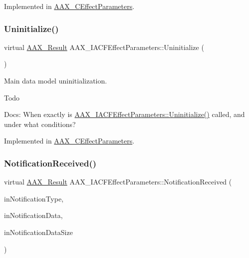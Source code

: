 Implemented in \mbox{\hyperlink{a01481_a245f235300b04f1c8b4c83831d296e22}{A\+A\+X\+\_\+\+C\+Effect\+Parameters}}.

\mbox{\label{a01669_a711969adc95624fb9ac8a3e3b2c23696}} 
\subsubsection{\texorpdfstring{Uninitialize()}{Uninitialize()}}
{\footnotesize\ttfamily virtual \mbox{\hyperlink{a00392_a4d8f69a697df7f70c3a8e9b8ee130d2f}{A\+A\+X\+\_\+\+Result}} A\+A\+X\+\_\+\+I\+A\+C\+F\+Effect\+Parameters\+::\+Uninitialize (\begin{DoxyParamCaption}{ }\end{DoxyParamCaption})\hspace{0.3cm}{\ttfamily [pure virtual]}}



Main data model uninitialization. 

\begin{DoxyRefDesc}{Todo}
\item[\mbox{\hyperlink{a00785__todo000035}{Todo}}]Docs\+: When exactly is \mbox{\hyperlink{a01669_a711969adc95624fb9ac8a3e3b2c23696}{A\+A\+X\+\_\+\+I\+A\+C\+F\+Effect\+Parameters\+::\+Uninitialize()}} called, and under what conditions?\end{DoxyRefDesc}


Implemented in \mbox{\hyperlink{a01481_acd14ff2175a10759045674e8e14508b1}{A\+A\+X\+\_\+\+C\+Effect\+Parameters}}.

\mbox{\label{a01669_aa3eaeb292d2ca84086a5a058171994fd}} 
\subsubsection{\texorpdfstring{NotificationReceived()}{NotificationReceived()}}
{\footnotesize\ttfamily virtual \mbox{\hyperlink{a00392_a4d8f69a697df7f70c3a8e9b8ee130d2f}{A\+A\+X\+\_\+\+Result}} A\+A\+X\+\_\+\+I\+A\+C\+F\+Effect\+Parameters\+::\+Notification\+Received (\begin{DoxyParamCaption}\item[{\mbox{\hyperlink{a00392_ac678f9c1fbcc26315d209f71a147a175}{A\+A\+X\+\_\+\+C\+Type\+ID}}}]{in\+Notification\+Type,  }\item[{const void $\ast$}]{in\+Notification\+Data,  }\item[{uint32\+\_\+t}]{in\+Notification\+Data\+Size }\end{DoxyParamCaption})\hspace{0.3cm}{\ttfamily [pure virtual]}}



